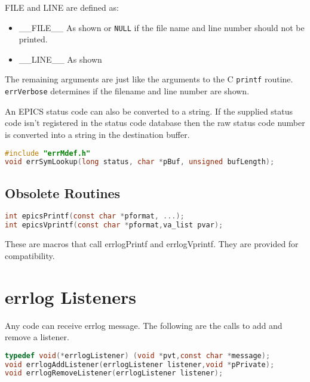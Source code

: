 FILE and LINE are defined as:

\begin{itemize}
\item \_\_FILE\_\_  As shown or \verb|NULL| if the file name and line number should not be printed.

\item \_\_LINE\_\_  As shown

\end{itemize}

The remaining arguments are just like the arguments to the C \verb|printf| routine.
\verb|errVerbose| determines if the filename and line number are shown.

An EPICS status code can also be converted to a string.
If the supplied status code isn't registered in the status code database then the raw status code number is converted into a string in the destination buffer.

\begin{lstlisting}[language=C]
#include "errMdef.h"
void errSymLookup(long status, char *pBuf, unsigned bufLength);
\end{lstlisting}

\subsection{Obsolete Routines }

\begin{lstlisting}[language=C]
int epicsPrintf(const char *pformat, ...);
int epicsVprintf(const char *pformat,va_list pvar);
\end{lstlisting}

These are macros that call errlogPrintf and errlogVprintf.
They are provided for compatibility.

\section{errlog Listeners}

Any code can receive errlog message.
The following are the calls to add and remove a listener.

\begin{lstlisting}[language=C]
typedef void(*errlogListener) (void *pvt,const char *message);
void errlogAddListener(errlogListener listener,void *pPrivate);
void errlogRemoveListener(errlogListener listener);
\end{lstlisting}

